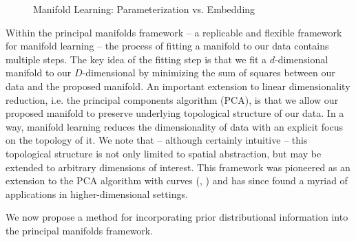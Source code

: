 \documentclass[twoside,11pt]{article}
\begin{document}
\begin{figure}[h!]
\begin{center}
  \end{center}
  \caption{Manifold Learning: Parameterization vs. Embedding}\label{fig:manifolds}
\end{figure}

Within the principal manifolds framework \citep{Meng2021} -- a replicable and flexible framework for manifold learning -- the process of fitting a manifold to our data contains multiple steps. The key idea of the fitting step is that we fit a $d$-dimensional manifold to our $D$-dimensional by minimizing the sum of squares between our data and the proposed manifold. An important extension to linear dimensionality reduction, i.e. the principal components algorithm (PCA), is that we allow our proposed manifold to preserve underlying topological structure of our data. In a way, manifold learning reduces the dimensionality of data with an explicit focus on the topology of it. We note that -- although certainly intuitive -- this topological structure is not only limited to spatial abstraction, but may be extended to arbitrary dimensions of interest. This framework was pioneered as an extension to the PCA algorithm with curves (\citet{HastieStuetzle1989}, \citet{Tibshirani1992}) and has since found a myriad of applications in higher-dimensional settings. 

We now propose a method for incorporating prior distributional information into the principal manifolds framework. 
\end{document}
